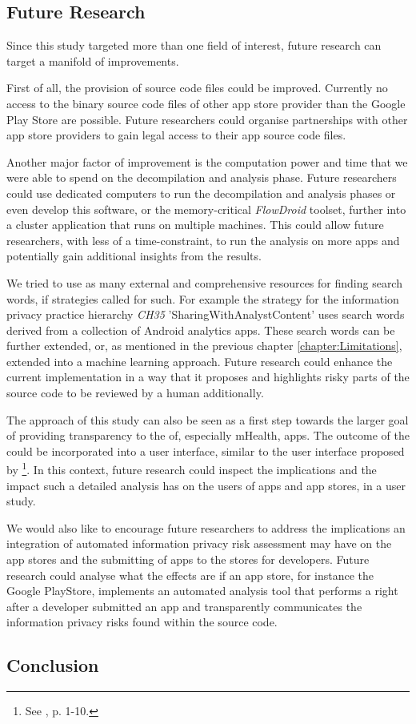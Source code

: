 \subsection{Future Research}

Since this study targeted more than one field of interest, future research can target a manifold of improvements.

First of all, the provision of source code files could be improved. 
Currently no access to the binary source code files of other app store provider than the Google Play Store are possible.
Future researchers could organise partnerships with other app store providers to gain legal access to their app source code files.

Another major factor of improvement is the computation power and time that we were able to spend on the decompilation and analysis phase.
Future researchers could use dedicated computers to run the decompilation and analysis phases or even develop this software, or the memory-critical \textit{FlowDroid} toolset, further into a cluster application that runs on multiple machines.
This could allow future researchers, with less of a time-constraint, to run the analysis on more apps and potentially gain additional insights from the results.

We tried to use as many external and comprehensive resources for finding search words, if strategies called for such.
For example the strategy for the information privacy practice hierarchy \textit{CH35} 'SharingWithAnalystContent' uses search words derived from a collection of Android analytics apps.
These search words can be further extended, or, as mentioned in the previous chapter \ref{chapter:Limitations}, extended into a machine learning approach. 
Future research could enhance the current implementation in a way that it proposes and highlights risky parts of the source code to be reviewed by a human additionally.

The approach of this study can also be seen as a first step towards the larger goal of providing transparency to the \ipr of, especially mHealth, apps.
The outcome of the \aiprat could be incorporated into a user interface, similar to the user interface proposed by \textcite{Bruggemann2016}\footnote{See \cite{Bruggemann2016}, p. 1-10.}.
In this context, future research could inspect the implications and the impact such a detailed \ipr analysis has on the users of apps and app stores, in a user study.

We would also like to encourage future researchers to address the implications an integration of automated information privacy risk assessment may have on the app stores and the submitting of apps to the stores for developers.
Future research could analyse what the effects are if an app store, for instance the Google PlayStore, implements an automated \ipr analysis tool that performs a \sca right after a developer submitted an app and transparently communicates the information privacy risks found within the source code.


\subsection{Conclusion}